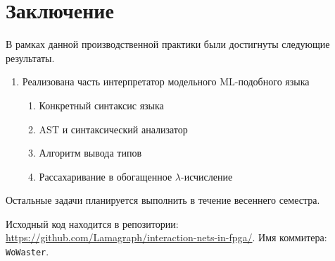 
\section*{Заключение}

В рамках данной производственной практики были достигнуты следующие результаты.
\begin{enumerate}
    \item Реализована часть интерпретатор модельного ML-подобного языка
          \begin{enumerate}
              \item Конкретный синтаксис языка
              \item AST и синтаксический анализатор
              \item Алгоритм вывода типов
              \item Рассахаривание в обогащенное $\lambda$-исчисление
          \end{enumerate}
\end{enumerate}

Остальные задачи планируется выполнить в течение весеннего семестра.

Исходный код находится в репозитории: \url{https://github.com/Lamagraph/interaction-nets-in-fpga/}.
Имя коммитера: \texttt{WoWaster}.
